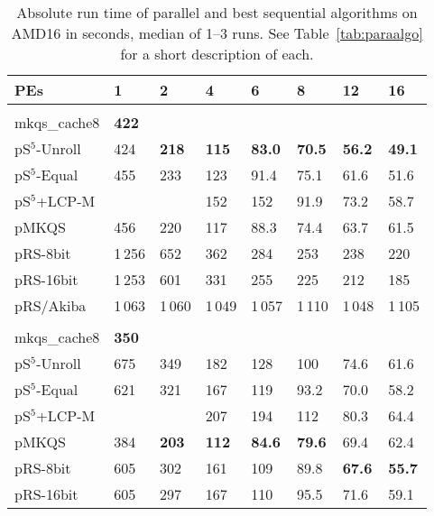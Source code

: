 \documentclass[a4paper]{myjournal}
\begin{document}
\begin{table}\centering\small
\caption{Absolute run time of parallel and best sequential algorithms on AMD16 in seconds, median of 1--3 runs. See Table~\ref{tab:paraalgo} for a short description of each.}\label{tab:absrun-AMD16}
\begin{tabularx}{\linewidth}{l|*{7}{>{\hfill}X}|@{}}
PEs & 1   & 2 & 4 & 6 & 8 & 12 & 16 \\ \hline
& \multicolumn{7}{l|}{\textbf{URLs}, $n = 500\,\text{M}$, $N = 32\,\text{Gi}$, $\frac{D}{N} = 95.4\,\%$} \\ \cline{2-8}
mkqs\_cache8 & \bf 422 &  &  &  &  &  &  \\
pS$^5$-Unroll &    424 & \bf 218 & \bf 115 & \bf 83.0 & \bf 70.5 & \bf 56.2 & \bf 49.1 \\
 pS$^5$-Equal &    455 &     233 &     123 &     91.4 &     75.1 &     61.6 &     51.6 \\
 pS$^5$+LCP-M &        &         &     152 &      152 &     91.9 &     73.2 &     58.7 \\
        pMKQS &    456 &     220 &     117 &     88.3 &     74.4 &     63.7 &     61.5 \\
     pRS-8bit & 1\,256 &     652 &     362 &      284 &      253 &      238 &      220 \\
    pRS-16bit & 1\,253 &     601 &     331 &      255 &      225 &      212 &      185 \\
    pRS/Akiba & 1\,063 &  1\,060 &  1\,049 &   1\,057 &   1\,110 &   1\,048 &   1\,105 \\ \hline
& \multicolumn{7}{l|}{\textbf{Random}, $n = 1.23\,\text{G}$, $N = 12\,\text{Gi}$, $\frac{D}{N} = 43.7\,\%$} \\ \cline{2-8}
mkqs\_cache8 & \bf 350 &  &  &  &  &  &  \\
pS$^5$-Unroll & 675 &     349 &     182 &      128 &      100 &     74.6 &     61.6 \\
 pS$^5$-Equal & 621 &     321 &     167 &      119 &     93.2 &     70.0 &     58.2 \\
 pS$^5$+LCP-M &     &         &     207 &      194 &      112 &     80.3 &     64.4 \\
        pMKQS & 384 & \bf 203 & \bf 112 & \bf 84.6 & \bf 79.6 &     69.4 &     62.4 \\
     pRS-8bit & 605 &     302 &     161 &      109 &     89.8 & \bf 67.6 & \bf 55.7 \\
    pRS-16bit & 605 &     297 &     167 &      110 &     95.5 &     71.6 &     59.1 \\

\end{tabularx}
\end{table}
\end{document}
